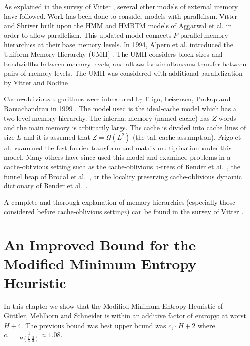 \documentclass[letterpaper,12pt,titlepage,oneside,final]{book}
\theoremstyle{plain}
\begin{document}
As explained in the survey of Vitter \cite{vitter2001external}, several other models of external memory have followed. Work has been done to consider models with parallelism. Vitter and Shriver \cite{vitter1994algorithms} built upon the HMM and HMBTM models of Aggarwal et al. \cite{aggarwal1987model, aggarwal1987hierarchical} in order to allow parallelism. This updated model connects $P$ parallel memory hierarchies at their base memory levels. In 1994, Alpern et al. introduced the Uniform Memory Hierarchy (UMH) \cite{alpern1994uniform}. The UMH considers block sizes and bandwidths between memory levels, and allows for simultaneous transfer between pairs of memory levels. The UMH was considered with additional parallelization by Vitter and Nodine \cite{vitter1993large}.


Cache-oblivious algorithms were introduced by Frigo, Leiserson, Prokop and Ramachandran in 1999 \cite{frigo1999cache}. The model used is the ideal-cache model which has a two-level memory hierarchy. The internal memory (named cache) has $Z$ words and the main memory is arbitrarily large. The cache is divided into cache lines of size $L$ and it is assumed that $Z=\Omega(L^2)$ (the tall cache assumption). Frigo et al.~examined the fast fourier transform and matrix multiplication under this model. Many others have since used this model and examined problems in a cache-oblivious setting such as the cache-oblivious b-trees of Bender et al.~\cite{bender2000cache}, the funnel heap of Brodal et al.~\cite{brodal2002funnel}, or the locality preserving cache-oblivious dynamic dictionary of Bender et al.~\cite{bender2002locality}.

A complete and thorough explanation of memory hierarchies (especially those considered before cache-oblivious settings) can be found in the survey of Vitter \cite{vitter2001external}.



\chapter{An Improved Bound for the Modified Minimum Entropy Heuristic}\label{An Improved Bound for the Modified Minimum Entropy Heuristic}

In this chapter we show that the Modified Minimum Entropy Heuristic of G{\"u}ttler, Mehlhorn and Schneider \cite{guttler1980binary} is within an additive factor of entropy: at worst $H+4$. The previous bound was best upper bound was $c_1\cdot H+2$ where $c_1=\frac{1}{H(\frac{1}{3}, \frac{2}{3})} \approx 1.08$.
\end{document}
